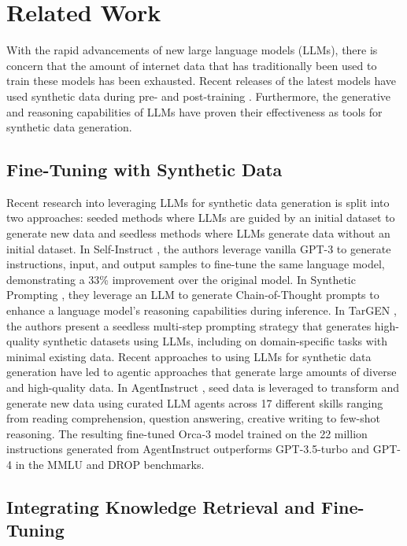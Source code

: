 \section{Related Work}

With the rapid advancements of new large language models (LLMs), there is
concern that the amount of internet data that has traditionally been used to
train these models has been exhausted. Recent releases of the latest models
have used synthetic data during pre- and post-training \citep{abdin_phi-3_2024,
dubey_llama_2024, bai_qwen_2023}. Furthermore, the generative and reasoning
capabilities of LLMs have proven their effectiveness as tools for synthetic data
generation.

\subsection{Fine-Tuning with Synthetic Data}

Recent research into leveraging LLMs for synthetic data generation is split
into two approaches: seeded methods where LLMs are guided by an initial dataset
to generate new data and seedless methods where LLMs generate data without an
initial dataset. In Self-Instruct \citep{wang_self-instruct_2023}, the authors
leverage vanilla GPT-3 to generate instructions, input, and output samples to
fine-tune the same language model, demonstrating a 33\% improvement over the
original model. In Synthetic Prompting \cite{shao_synthetic_2023}, they leverage
an LLM to generate Chain-of-Thought prompts to enhance a language model’s
reasoning capabilities during inference. In TarGEN \citep{gupta2023targen}, the
authors present a seedless multi-step prompting strategy that generates
high-quality synthetic datasets using LLMs, including on domain-specific tasks
with minimal existing data. Recent approaches to using LLMs for synthetic data
generation have led to agentic approaches that generate large amounts of diverse
and high-quality data. In AgentInstruct \citep{mitra_agentinstruct_2024}, seed
data is leveraged to transform and generate new data using curated LLM agents
across 17 different skills ranging from reading comprehension, question
answering, creative writing to few-shot reasoning. The resulting fine-tuned
Orca-3 model trained on the 22 million instructions generated from AgentInstruct
outperforms GPT-3.5-turbo and GPT-4 in the MMLU and DROP benchmarks.

\subsection{Integrating Knowledge Retrieval and Fine-Tuning}

